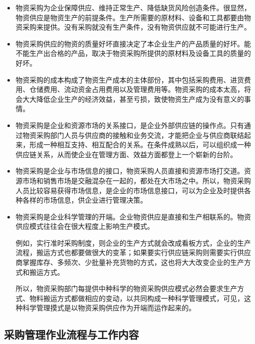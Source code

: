     \begin{itemize}
        \item 物资采购为企业保障供应、维持正常生产、降低缺货风险创造条件。很显然，物资供应是物资生产的前提条件。生产所需要的原材料、设备和工具都要由物资采购来提供。没有采购就没有生产条件，没有物资供应就不可能进行生产。

        \item 物资采购供应的物资的质量好坏直接决定了本企业生产的产品质量的好坏。能不能生产出合格的产品，取决于物资采购所提供的原材料及设备工具的质量的好坏。

        \item 物资采购的成本构成了物资生产成本的主体部份，其中包括采购费用、进货费用、仓储费用、流动资金占用费用以及管理费用等。物资采购的成本太高，将会大大降低企业生产的经济效益，甚至亏损，致使物资生产成为没有意义的事情。

        \item 物资采购是企业和资源市场的关系接口，是企业外部供应链的操作点。只有通过物资采购部门人员与供应商的接触和业务交流，才能把企业与供应商联结起来，形成一种相互支持、相互配合的关系。在条件成熟以后，可以组织成一种供应链关系，从而使企业在管理方面、效益方面都登上一个崭新的台阶。

        \item 物资采购是企业与市场信息的接口，物资采购人员直接和资源市场打交道。资源市场和销售市场是交融混杂在一起的，都处在大市场之中。所以，物资采购人员比较容易获得市场信息，是企业的市场信息接口，可以为企业及时提供各种各样的市场信息，供企业进行管理决策。

        \item 物资采购是企业科学管理的开端。企业物资供应是直接和生产相联系的。物资供应模式往往会在很大程度上影响生产模式。

            例如，实行准时采购制度，则企业的生产方式就会改成看板方式，企业的生产流程，搬运方式也都要做很大的变革；如果要实行供应链采购则需要实行供应商掌握库存、多频次、少批量补充货物的方式，这也将大大改变企业的生产方式和搬运方式。

            所以，物资采购部门每提供中种科学的物资采购供应模式必然会要求生产方式、物料搬运方式都做相应的变动，以共同构成一种科学管理模式，可见，这种科学管理摸式是以物资采购供应作为开端而运作起来的。

    \end{itemize}

\subsection {采购管理作业流程与工作内容}

